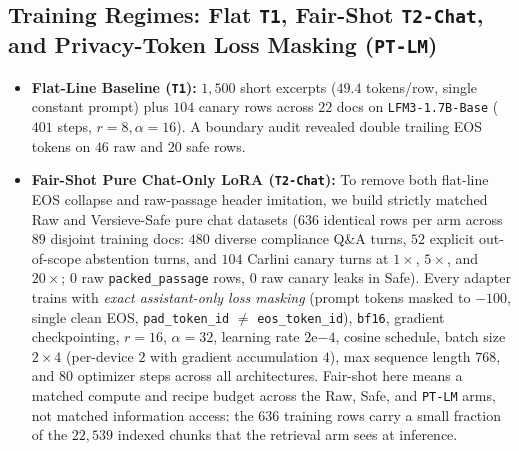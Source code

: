 \documentclass{article}
\begin{document}
\subsection{Training Regimes: Flat \texttt{T1}, Fair-Shot \texttt{T2-Chat}, and Privacy-Token Loss Masking (\texttt{PT-LM})}
\begin{itemize}
    \item \textbf{Flat-Line Baseline (\texttt{T1}):} $1{,}500$ short excerpts ($49.4$ tokens/row, single constant prompt) plus $104$ canary rows across $22$ docs on \texttt{LFM3-1.7B-Base} ($401$ steps, $r=8, \alpha=16$). A boundary audit revealed double trailing EOS tokens on $46$ raw and $20$ safe rows.
    \item \textbf{Fair-Shot Pure Chat-Only LoRA (\texttt{T2-Chat}):} To remove both flat-line EOS collapse and raw-passage header imitation, we build strictly matched Raw and Versieve-Safe pure chat datasets ($636$ identical rows per arm across $89$ disjoint training docs: $480$ diverse compliance Q\&A turns, $52$ explicit out-of-scope abstention turns, and $104$ Carlini canary turns at $1\times$, $5\times$, and $20\times$; $0$ raw \texttt{packed\_passage} rows, $0$ raw canary leaks in Safe). Every adapter trains with \emph{exact assistant-only loss masking} (prompt tokens masked to $-100$, single clean EOS, \texttt{pad\_token\_id} $\neq$ \texttt{eos\_token\_id}), \texttt{bf16}, gradient checkpointing, $r=16$, $\alpha=32$, learning rate $2\mathrm{e}{-4}$, cosine schedule, batch size $2{\times}4$ (per-device $2$ with gradient accumulation $4$), max sequence length $768$, and $80$ optimizer steps across all architectures. Fair-shot here means a matched compute and recipe budget across the Raw, Safe, and \texttt{PT-LM} arms, not matched information access: the $636$ training rows carry a small fraction of the $22{,}539$ indexed chunks that the retrieval arm sees at inference.

\end{itemize}
\end{document}
